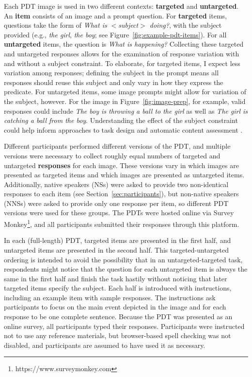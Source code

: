 Each PDT image is used in two different contexts: \textbf{targeted} and \textbf{untargeted}. An \textbf{item} consists of an image and a prompt question. For \textbf{targeted} items, questions take the form of \textit{What is $<$subject$>$ doing?}, with the subject provided (e.g., \textit{the girl}, \textit{the boy}; see Figure~\ref{fig:example-pdt-items}). For all \textbf{untargeted} items, the question is \textit{What is happening?}
Collecting these targeted and untargeted responses allows for the examination of response variation with and without a subject constraint. To elaborate, for targeted items, I expect less variation among responses; defining the subject in the prompt means all responses should reuse this subject and only vary in how they express the predicate. For untargeted items, some image prompts might allow for variation of the subject, however. For the image in Figure~\ref{fig:image-prep}, for example, valid responses could include \textit{The boy is throwing a ball to the girl} as well as \textit{The girl is catching a ball from the boy}. Understanding the effect of the subject constraint could help inform approaches to task design and automatic content assessment \citep{foster2009native, cho2013investigating}. 

Different participants performed different versions of the PDT, and multiple versions were necessary to collect roughly equal numbers of targeted and untargeted \textbf{responses} for each image. These versions vary in which images are presented as targeted items and which images are presented as untargeted items. Additionally, native speakers (NSs) were asked to provide two non-identical responses to each item (see Section~\ref{sec:participants}), but non-native speakers (NNSs) were asked to provide only one response per item, so different PDT versions were used for these groups. The PDTs were hosted online via Survey Monkey\footnote{https://www.surveymonkey.com}, and all participants submitted their responses through this platform. %

In each (full-length) PDT, targeted items are presented in the first half, and untargeted items are presented in the second half. This targeted-untargeted ordering is intended to avoid the possibility that in an untargeted-targeted task, respondents might notice that the question for each untargeted item is always the same in the first half and finish the task hastily without noticing that later targeted items specify the subject. Each half is introduced with instructions, including an example item with sample responses. The instructions ask participants to focus on the main event depicted in the image and for each response to be one complete sentence. Because the PDT was presented as an online survey, all participants typed their responses. Participants were instructed not to use any reference materials, but browser-based spell checking was not disabled, and participants are assumed to have used it as necessary.

